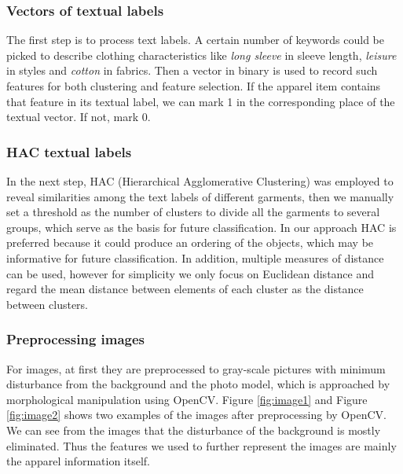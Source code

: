 \subsubsection{Vectors of textual labels}
The first step is to process text labels. A certain number of keywords could be picked to describe clothing characteristics like \emph{long sleeve} in sleeve length, \emph{leisure} in styles and \emph{cotton} in fabrics. Then a vector in binary is used to record such features for both clustering and feature selection. If the apparel item contains that feature in its textual label, we can mark 1 in the corresponding place of the textual vector. If not, mark 0.

\subsubsection{HAC textual labels}
In the next step, HAC (Hierarchical Agglomerative Clustering) was employed to reveal similarities among the text labels of different 
garments, then we manually set a threshold as the number of clusters to divide all the garments to several groups, which serve as the basis for future classification.
In our approach HAC is preferred because it could produce an ordering of the objects, which may be informative for future classification.  In addition, multiple measures of distance can be used, however for simplicity we only focus on Euclidean distance and regard the mean distance between elements of each cluster as the distance between clusters.

\subsubsection{Preprocessing images}
For images, at first they are preprocessed to gray-scale pictures with minimum disturbance from the background and the photo model, which is approached by morphological manipulation using OpenCV. Figure \ref{fig:image1} and Figure \ref{fig:image2} shows two examples of the images after preprocessing by OpenCV. We can see from the images that the disturbance of the background is mostly eliminated. Thus the features we used to further represent the images are mainly the apparel information itself.

